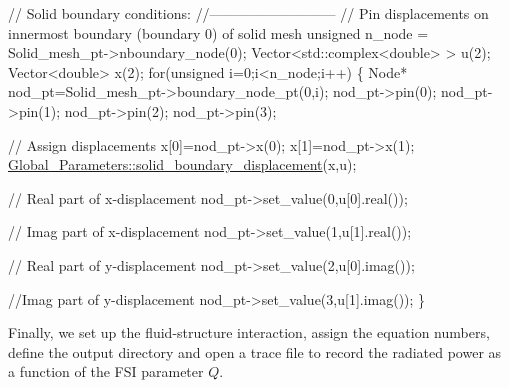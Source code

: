 \begin{DoxyCodeInclude}
 

 \textcolor{comment}{// Solid boundary conditions:}
 \textcolor{comment}{//---------------------------}
 \textcolor{comment}{// Pin displacements on innermost boundary (boundary 0) of solid mesh}
 \textcolor{keywordtype}{unsigned} n\_node = Solid\_mesh\_pt->nboundary\_node(0);
 Vector<std::complex<double> > u(2);
 Vector<double> x(2);
 \textcolor{keywordflow}{for}(\textcolor{keywordtype}{unsigned} i=0;i<n\_node;i++)
  \{
   Node* nod\_pt=Solid\_mesh\_pt->boundary\_node\_pt(0,i);
   nod\_pt->pin(0);
   nod\_pt->pin(1);
   nod\_pt->pin(2);
   nod\_pt->pin(3);

   \textcolor{comment}{// Assign displacements}
   x[0]=nod\_pt->x(0);   
   x[1]=nod\_pt->x(1);   
   \hyperlink{namespaceGlobal__Parameters_ab51fa55d06d9963d363bcf966cfcc62b}{Global\_Parameters::solid\_boundary\_displacement}(x,u);

   \textcolor{comment}{// Real part of x-displacement}
   nod\_pt->set\_value(0,u[0].real());

   \textcolor{comment}{// Imag part of x-displacement}
   nod\_pt->set\_value(1,u[1].real());

   \textcolor{comment}{// Real part of y-displacement}
   nod\_pt->set\_value(2,u[0].imag());

   \textcolor{comment}{//Imag part of y-displacement}
   nod\_pt->set\_value(3,u[1].imag());
  \}

\end{DoxyCodeInclude}


Finally, we set up the fluid-\/structure interaction, assign the equation numbers, define the output directory and open a trace file to record the radiated power as a function of the F\+SI parameter $ Q $.






